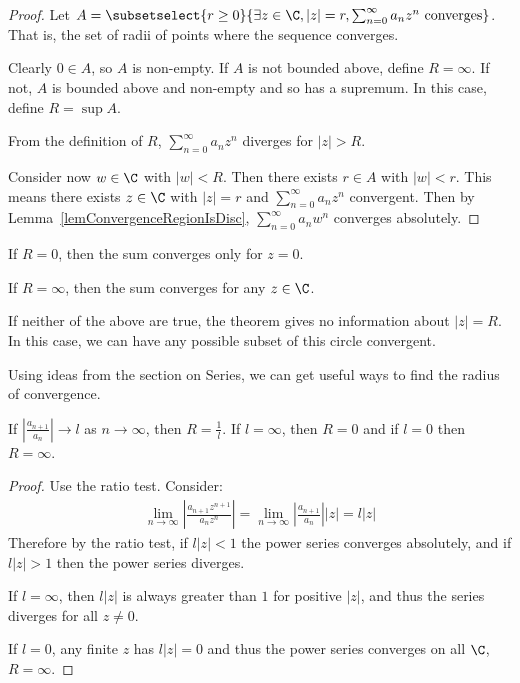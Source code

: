 \documentclass[../Main.tex]{subfiles}
\begin{document}
\begin{proof}
    Let $A = \subsetselect{r \geq 0}{\exists z \in \C, |z| = r, \sum_{n=0}^\infty a_n z^n \text{ converges}}$. That is, the set of radii of points where the sequence converges.

    Clearly $0 \in A$, so $A$ is non-empty. If $A$ is not bounded above, define $R = \infty$. If not, $A$ is bounded above and non-empty and so has a supremum. In this case, define $R = \sup A$.

    From the definition of $R$, $\sum_{n=0}^\infty a_n z^n$ diverges for $|z| > R$.\par
    Consider now $w \in \C$ with $|w| < R$. Then there exists $r \in A$ with $|w| < r$. This means there exists $z \in \C$ with $|z| = r$ and $\sum_{n=0}^\infty a_n z^n$ convergent. Then by Lemma~\ref{lemConvergenceRegionIsDisc}, $\sum_{n=0}^\infty a_n w^n$ converges absolutely.
\end{proof}
\begin{remarks}
    \item If $R = 0$, then the sum converges only for $z = 0$.
    \item If $R = \infty$, then the sum converges for any $z \in \C$.
    \item If neither of the above are true, the theorem gives no information about $|z| = R$. In this case, we can have any possible subset of this circle convergent.
\end{remarks}
Using ideas from the section on Series, we can get useful ways to find the radius of convergence.
\begin{lemma}
    If $\left|\frac{a_{n+1}}{a_n}\right| \to l$ as $n \to \infty$, then $R = \frac{1}{l}$. If $l = \infty$, then $R = 0$ and if $l = 0$ then $R = \infty$.
    \label{lemRatioReciprocalRadius}
\end{lemma}
\begin{proof}
    Use the ratio test. Consider:
    \begin{align*}
	\lim_{n \to \infty} \left|\frac{a_{n+1} z^{n+1}}{a_n z^n}\right| = \lim_{n \to \infty} \left|\frac{a_{n+1}}{a_n}\right| |z| = l|z|
    \end{align*}
    Therefore by the ratio test, if $l|z| < 1$ the power series converges absolutely, and if $l|z| > 1$ then the power series diverges.

    If $l = \infty$, then $l|z|$ is always greater than $1$ for positive $|z|$, and thus the series diverges for all $z \neq 0$.

    If $l = 0$, any finite $z$ has $l|z| = 0$ and thus the power series converges on all $\C$, $R = \infty$.
\end{proof}
\end{document}
